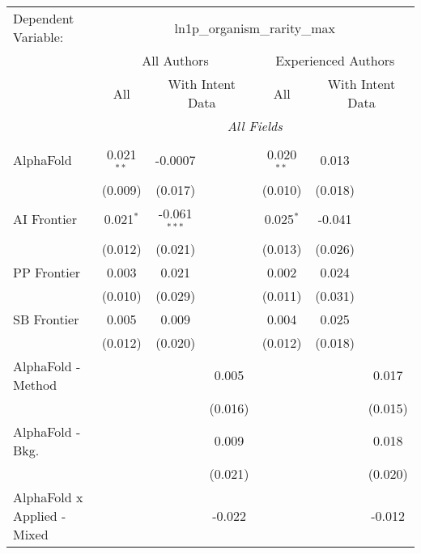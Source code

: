 \begingroup
\centering
\begin{tabular}{lcccccc}
   \tabularnewline \midrule \midrule
   Dependent Variable: & \multicolumn{6}{c}{ln1p\_organism\_rarity\_max}\\
 & \multicolumn{3}{c}{All Authors} & \multicolumn{3}{c}{Experienced Authors} \\
\cmidrule(lr){2-4} \cmidrule(lr){5-7}
 & \multicolumn{1}{c}{All} & \multicolumn{2}{c}{With Intent Data} & \multicolumn{1}{c}{All} & \multicolumn{2}{c}{With Intent Data} \\
\cmidrule(lr){2-2} \cmidrule(lr){3-4} \cmidrule(lr){5-5} \cmidrule(lr){6-7}
 & \multicolumn{6}{c}{\textit{All Fields}} \\ \\
   AlphaFold                     & 0.021$^{**}$ & -0.0007        &         & 0.020$^{**}$ & 0.013   &   \\   
                                 & (0.009)      & (0.017)        &         & (0.010)      & (0.018) &   \\   
   AI Frontier                   & 0.021$^{*}$  & -0.061$^{***}$ &         & 0.025$^{*}$  & -0.041  &   \\   
                                 & (0.012)      & (0.021)        &         & (0.013)      & (0.026) &   \\   
   PP Frontier                   & 0.003        & 0.021          &         & 0.002        & 0.024   &   \\   
                                 & (0.010)      & (0.029)        &         & (0.011)      & (0.031) &   \\   
   SB Frontier                   & 0.005        & 0.009          &         & 0.004        & 0.025   &   \\   
                                 & (0.012)      & (0.020)        &         & (0.012)      & (0.018) &   \\   
   AlphaFold - Method            &              &                & 0.005   &              &         & 0.017\\   
                                 &              &                & (0.016) &              &         & (0.015)\\   
   AlphaFold - Bkg.              &              &                & 0.009   &              &         & 0.018\\   
                                 &              &                & (0.021) &              &         & (0.020)\\   
   AlphaFold x Applied - Mixed   &              &                & -0.022  &              &         & -0.012\\   

\end{tabular}
